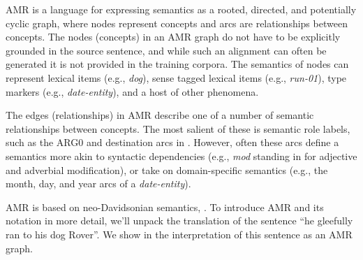 \documentclass[11pt]{article}
\newcommand\w[1]{\textit{#1}} %
\begin{document}


AMR is a language for expressing semantics as a rooted, directed, and potentially cyclic graph, where nodes represent concepts and arcs are relationships between concepts.
The nodes (concepts) in an AMR graph do not have to be explicitly grounded in the source sentence, and while such an alignment can often be generated it is not provided in the training corpora.
The semantics of nodes can represent lexical items (e.g., \w{dog}), sense tagged lexical items (e.g., \textit{run-01}), type markers (e.g., \textit{date-entity}), and a host of other phenomena.

The edges (relationships) in AMR describe one of a number of semantic relationships between concepts.
The most salient of these is semantic role labels, such as the ARG0 and destination arcs in .
However, often these arcs define a semantics more akin to syntactic dependencies (e.g., \textit{mod} standing in for adjective and adverbial modification), or take on domain-specific semantics (e.g., the month, day, and year arcs of a \textit{date-entity}).

AMR is based on neo-Davidsonian semantics, \cite{Davidson:1967,Parsons:1990}.
To introduce AMR and its notation in more detail, we'll unpack the translation of the sentence ``he gleefully ran to his dog Rover''. 
We show in  the interpretation of this sentence as an AMR graph.

\end{document}

